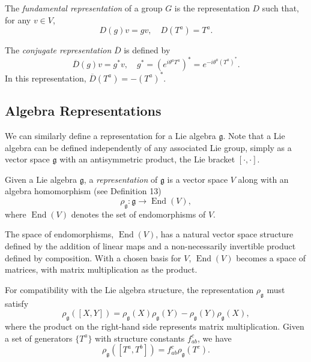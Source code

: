 \begin{definition}
The \emph{fundamental representation} of a group $G$ is the representation $D$ such that, for any $v \in V$,
\[
D(g)v = gv, \quad D(T^a) = T^a.
\]
\end{definition}

\begin{definition}
The \emph{conjugate representation} $\overline{D}$ is defined by
\[
\overline{D}(g)v = g^* v, \quad g^* = \left( e^{i \theta^a T^a} \right)^* = e^{-i \theta^a (T^a)^*}.
\]
In this representation, $\overline{D}(T^a) = -(T^a)^*$.
\end{definition}

\subsection{Algebra Representations}

We can similarly define a representation for a Lie algebra $\mathfrak{g}$. Note that a Lie algebra can be defined independently of any associated Lie group, simply as a vector space $\mathfrak{g}$ with an antisymmetric product, the Lie bracket $[ \cdot, \cdot ]$.

\begin{definition}
Given a Lie algebra $\mathfrak{g}$, a \emph{representation} of $\mathfrak{g}$ is a vector space $V$ along with an algebra homomorphism (see Definition 13)
\[
\rho_\mathfrak{g} : \mathfrak{g} \to \operatorname{End}(V),
\]
where $\operatorname{End}(V)$ denotes the set of endomorphisms of $V$.
\end{definition}

The space of endomorphisms, $\operatorname{End}(V)$, has a natural vector space structure defined by the addition of linear maps and a non-necessarily invertible product defined by composition. With a chosen basis for $V$, $\operatorname{End}(V)$ becomes a space of matrices, with matrix multiplication as the product.

For compatibility with the Lie algebra structure, the representation $\rho_\mathfrak{g}$ must satisfy
\[
\rho_\mathfrak{g}([X, Y]) = \rho_\mathfrak{g}(X)\rho_\mathfrak{g}(Y) - \rho_\mathfrak{g}(Y)\rho_\mathfrak{g}(X),
\]
where the product on the right-hand side represents matrix multiplication. Given a set of generators $\{ T^a \}$ with structure constants $f^c_{ab}$, we have
\[
\rho_\mathfrak{g}([T^a, T^b]) = f^c_{ab} \rho_\mathfrak{g}(T^c).
\]

